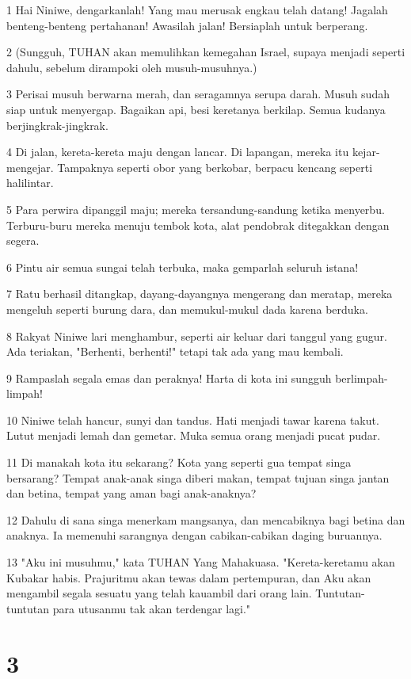 \par 1 Hai Niniwe, dengarkanlah! Yang mau merusak engkau telah datang! Jagalah benteng-benteng pertahanan! Awasilah jalan! Bersiaplah untuk berperang.
\par 2 (Sungguh, TUHAN akan memulihkan kemegahan Israel, supaya menjadi seperti dahulu, sebelum dirampoki oleh musuh-musuhnya.)
\par 3 Perisai musuh berwarna merah, dan seragamnya serupa darah. Musuh sudah siap untuk menyergap. Bagaikan api, besi keretanya berkilap. Semua kudanya berjingkrak-jingkrak.
\par 4 Di jalan, kereta-kereta maju dengan lancar. Di lapangan, mereka itu kejar-mengejar. Tampaknya seperti obor yang berkobar, berpacu kencang seperti halilintar.
\par 5 Para perwira dipanggil maju; mereka tersandung-sandung ketika menyerbu. Terburu-buru mereka menuju tembok kota, alat pendobrak ditegakkan dengan segera.
\par 6 Pintu air semua sungai telah terbuka, maka gemparlah seluruh istana!
\par 7 Ratu berhasil ditangkap, dayang-dayangnya mengerang dan meratap, mereka mengeluh seperti burung dara, dan memukul-mukul dada karena berduka.
\par 8 Rakyat Niniwe lari menghambur, seperti air keluar dari tanggul yang gugur. Ada teriakan, "Berhenti, berhenti!" tetapi tak ada yang mau kembali.
\par 9 Rampaslah segala emas dan peraknya! Harta di kota ini sungguh berlimpah-limpah!
\par 10 Niniwe telah hancur, sunyi dan tandus. Hati menjadi tawar karena takut. Lutut menjadi lemah dan gemetar. Muka semua orang menjadi pucat pudar.
\par 11 Di manakah kota itu sekarang? Kota yang seperti gua tempat singa bersarang? Tempat anak-anak singa diberi makan, tempat tujuan singa jantan dan betina, tempat yang aman bagi anak-anaknya?
\par 12 Dahulu di sana singa menerkam mangsanya, dan mencabiknya bagi betina dan anaknya. Ia memenuhi sarangnya dengan cabikan-cabikan daging buruannya.
\par 13 "Aku ini musuhmu," kata TUHAN Yang Mahakuasa. "Kereta-keretamu akan Kubakar habis. Prajuritmu akan tewas dalam pertempuran, dan Aku akan mengambil segala sesuatu yang telah kauambil dari orang lain. Tuntutan-tuntutan para utusanmu tak akan terdengar lagi."

\chapter{3}


